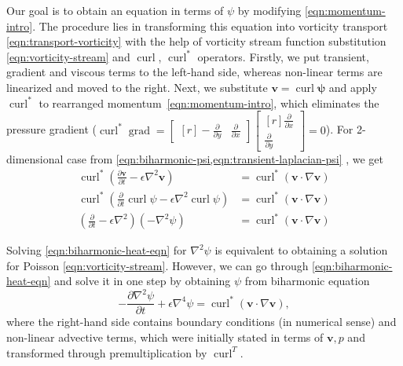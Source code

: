 \documentclass{article}
\numberwithin{equation}{section}
\begin{document}
Our goal is to obtain an equation in terms of $\psi$ by modifying \cref{eqn:momentum-intro}. 
	The procedure lies in transforming this equation into vorticity transport \cref{eqn:transport-vorticity} with the help of vorticity stream function substitution \cref{eqn:vorticity-stream} and $\operatorname{curl}$, $\operatorname{curl}^*$ operators. 
	Firstly, we put transient, gradient and viscous terms to the left-hand side, whereas non-linear terms are linearized and moved to the right. 
	Next, we substitute $\boldsymbol{v}=\operatorname{curl}\boldsymbol{\psi}$ and apply $\operatorname{curl}^*$ to rearranged momentum~\cref{eqn:momentum-intro}, which eliminates the pressure gradient ($\operatorname{curl}^*\operatorname{grad}=\begin{bmatrix*}[r]-\frac{\partial}{\partial y}&\frac{\partial}{\partial x}	\end{bmatrix*}\begin{bmatrix*}[r] \frac{\partial}{\partial x}\\ \frac{\partial}{\partial y} \end{bmatrix*}=0$). 
	For 2-dimensional case from \cref{eqn:biharmonic-psi,eqn:transient-laplacian-psi} , we get
	\begin{align}
		\operatorname{curl}^*\left( \frac{\partial \boldsymbol{v}}{\partial t} -\epsilon \nabla^2 \boldsymbol{v} \right)
			&=\operatorname{curl}^*\left( \boldsymbol{v}\cdot\nabla\boldsymbol{v}\right)\\
		\operatorname{curl}^*\left( \frac{\partial }{\partial t}\operatorname{curl}\psi -\epsilon \nabla^2 \operatorname{curl}\psi \right)
			&=\operatorname{curl}^*\left( \boldsymbol{v}\cdot\nabla\boldsymbol{v}\right)\\
		\left(\frac{\partial}{\partial t} -\epsilon \nabla^2\right)\left(-\nabla^2\psi\right)
			&=\operatorname{curl}^*\left( \boldsymbol{v}\cdot\nabla\boldsymbol{v}\right)\label{eqn:biharmonic-heat-eqn}
	\end{align}
	
	Solving \cref{eqn:biharmonic-heat-eqn} for $\nabla^2\psi$ is equivalent to obtaining a solution for Poisson \cref{eqn:vorticity-stream}. However, we can go through \cref{eqn:biharmonic-heat-eqn} and solve it in one step by obtaining $\psi$ from biharmonic equation
	\begin{equation}
	\label{eqn:biharmonic-streamfunction}
		\boxed{
		-\frac{\partial\nabla ^2 \psi}{\partial t} 
		+\epsilon\nabla ^4 \psi=\operatorname{curl}^*\left( \boldsymbol{v}\cdot\nabla\boldsymbol{v}\right),
		}
	\end{equation}
where the right-hand side contains boundary conditions (in numerical sense) and non-linear advective terms, which were initially stated in terms of $\boldsymbol{v},p$ and transformed through premultiplication by $\operatorname{curl}^T$. 
\end{document}
